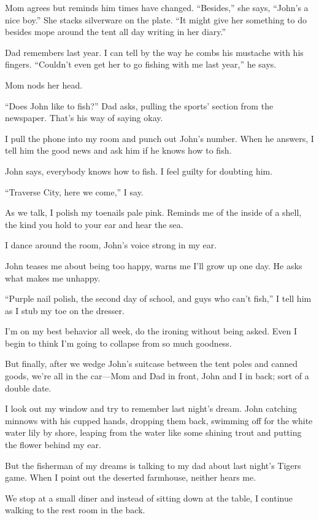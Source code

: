 \documentclass[
]{article}
\begin{document}
Mom agrees but reminds him times have changed. ``Besides,'' she says,
``John's a nice boy.'' She stacks silverware on the plate. ``It might
give her something to do besides mope around the tent all day writing in
her diary.''

Dad remembers last year. I can tell by the way he combs his mustache
with his fingers. ``Couldn't even get her to go fishing with me last
year,'' he says.

Mom nods her head.

``Does John like to fish?'' Dad asks, pulling the sports' section from
the newspaper. That's his way of saying okay.

I pull the phone into my room and punch out John's number. When he
answers, I tell him the good news and ask him if he knows how to fish.

John says, everybody knows how to fish. I feel guilty for doubting him.

``Traverse City, here we come,'' I say.

As we talk, I polish my toenails pale pink. Reminds me of the inside of
a shell, the kind you hold to your ear and hear the sea.

I dance around the room, John's voice strong in my ear.

John teases me about being too happy, warns me I'll grow up one day. He
asks what makes me unhappy.

``Purple nail polish, the second day of school, and guys who can't
fish,'' I tell him as I stub my toe on the dresser.

I'm on my best behavior all week, do the ironing without being asked.
Even I begin to think I'm going to collapse from so much goodness.

But finally, after we wedge John's suitcase between the tent poles and
canned goods, we're all in the car---Mom and Dad in front, John and I in
back; sort of a double date.

I look out my window and try to remember last night's dream. John
catching minnows with his cupped hands, dropping them back, swimming off
for the white water lily by shore, leaping from the water like some
shining trout and putting the flower behind my ear.

But the fisherman of my dreams is talking to my dad about last night's
Tigers game. When I point out the deserted farmhouse, neither hears me.

We stop at a small diner and instead of sitting down at the table, I
continue walking to the rest room in the back.
\end{document}
